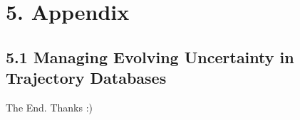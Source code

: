 \documentclass{beamer}
\begin{document}



\section{5. Appendix}

\subsection{5.1 Managing Evolving Uncertainty in Trajectory Databases}

% 
% 


\begin{frame}
\Huge{\centerline{The End. Thanks :)}}
\end{frame}

\end{document}
